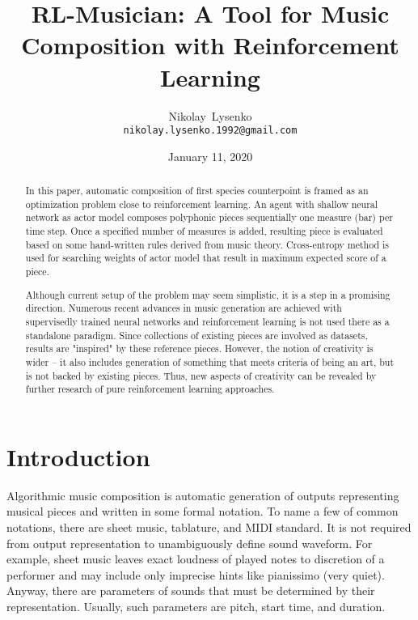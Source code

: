 \documentclass{article}
\title{RL-Musician: A Tool for Music Composition with Reinforcement Learning}
\date{January 11, 2020}
\author{
  Nikolay~Lysenko\\
  \texttt{nikolay.lysenko.1992@gmail.com} \\
}
\begin{document}
\maketitle

\begin{abstract}
In this paper, automatic composition of first species counterpoint is framed as an optimization problem close to reinforcement learning. An agent with shallow neural network as actor model composes polyphonic pieces sequentially one measure (bar) per time step. Once a specified number of measures is added, resulting piece is evaluated based on some hand-written rules derived from music theory. Cross-entropy method is used for searching weights of actor model that result in maximum expected score of a piece.

Although current setup of the problem may seem simplistic, it is a step in a promising direction. Numerous recent advances in music generation are achieved with supervisedly trained neural networks and reinforcement learning is not used there as a standalone paradigm. Since collections of existing pieces are involved as datasets, results are "inspired" by these reference pieces. However, the notion of creativity is wider -- it also includes generation of something that meets criteria of being an art, but is not backed by existing pieces. Thus, new aspects of creativity can be revealed by further research of pure reinforcement learning approaches.
\end{abstract}



\section{Introduction}
\label{sec:introduction}

Algorithmic music composition is automatic generation of outputs representing musical pieces and written in some formal notation. To name a few of common notations, there are sheet music, tablature, and MIDI standard. It is not required from output representation to unambiguously define sound waveform. For example, sheet music leaves exact loudness of played notes to discretion of a performer and may include only imprecise hints like pianissimo (very quiet). Anyway, there are parameters of sounds that must be determined by their representation. Usually, such parameters are pitch, start time, and duration.
\end{document}
